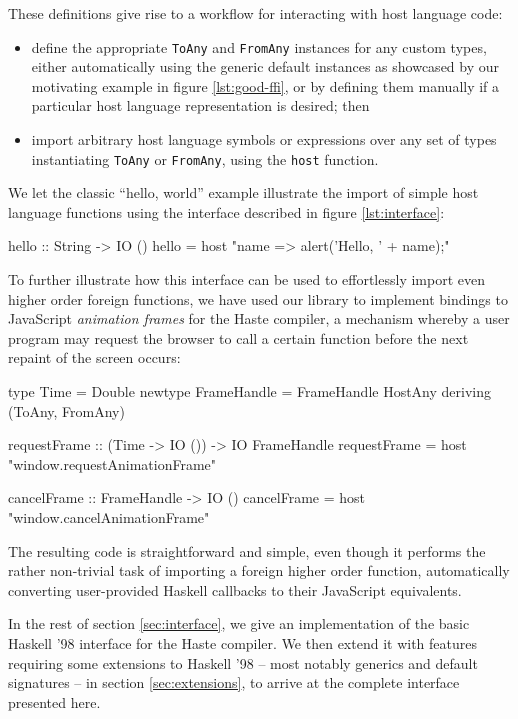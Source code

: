 \documentclass[preprint]{sigplanconf}
\begin{document}
These definitions give rise to a workflow for interacting with host
language code:
\begin{itemize}
\item
  define the appropriate \lstinline!ToAny! and \lstinline!FromAny! instances
  for any custom types, either automatically using the generic default instances
  as showcased by our motivating example in figure \ref{lst:good-ffi},
  or by defining them manually if a particular host language representation is
  desired; then
\item
  import arbitrary host language symbols or expressions over
  any set of types instantiating \lstinline!ToAny! or \lstinline!FromAny!,
  using the \lstinline!host! function.
\end{itemize}

We let the classic ``hello, world'' example illustrate the import of simple
host language functions using the interface described in figure
\ref{lst:interface}:

\begin{code}
  hello :: String -> IO ()
  hello = host "name => alert('Hello, ' + name);"
\end{code}

To further illustrate how this interface can be used to effortlessly import
even higher order foreign functions, we have used our library to
implement bindings to JavaScript \emph{animation frames} for the Haste
compiler, a mechanism whereby a user program may request the browser to call
a certain function before the next repaint of the screen occurs:

\begin{code}
  type Time = Double
  newtype FrameHandle = FrameHandle HostAny
    deriving (ToAny, FromAny)

  requestFrame :: (Time -> IO ()) -> IO FrameHandle
  requestFrame = host "window.requestAnimationFrame"

  cancelFrame :: FrameHandle -> IO ()
  cancelFrame = host "window.cancelAnimationFrame"
\end{code}

The resulting code is straightforward and simple, even though it performs
the rather non-trivial task of importing a foreign higher order function,
automatically converting user-provided Haskell callbacks to their JavaScript
equivalents.

In the rest of section \ref{sec:interface}, we give an implementation of the
basic Haskell '98 interface for the Haste compiler.
We then extend it with features requiring some extensions to Haskell '98 --
most notably generics and default signatures -- in section
\ref{sec:extensions}, to arrive at the complete interface presented here.
\end{document}
